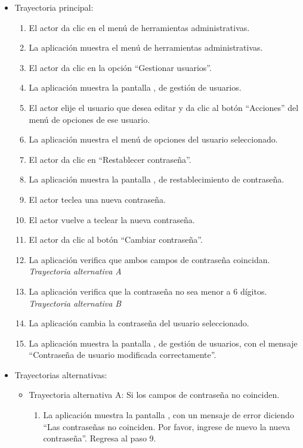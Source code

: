 			\begin{itemize}
				\item Trayectoria principal:
					\begin{enumerate}
						\item El actor da clic en el menú de herramientas administrativas.
						\item La aplicación muestra el menú de herramientas administrativas.
						\item El actor da clic en la opción ``Gestionar usuarios''.
						\item La aplicación muestra la pantalla , de gestión de usuarios.
						\item El actor elije el usuario que desea editar y da clic al botón ``Acciones'' del menú de opciones de ese usuario.
						\item La aplicación muestra el menú de opciones del usuario seleccionado.
						\item El actor da clic en ``Restablecer contraseña''.
						\item La aplicación muestra la pantalla , de restablecimiento de contraseña.
						\item El actor teclea una nueva contraseña.
						\item El actor vuelve a teclear la nueva contraseña.
						\item El actor da clic al botón ``Cambiar contraseña''.
						\item La aplicación verifica que ambos campos de contraseña coincidan. \textsl{Trayectoria alternativa A}
						\item La aplicación verifica que la contraseña no sea menor a 6 dígitos. \textsl{Trayectoria alternativa B}
						\item La aplicación cambia la contraseña del usuario seleccionado.
						\item La aplicación muestra la pantalla , de gestión de usuarios, con el mensaje ``Contraseña de usuario modificada correctamente''.
					\end{enumerate}
				\item Trayectorias alternativas:
					\begin{itemize}
						\item Trayectoria alternativa A: Si los campos de contraseña no coinciden.
							\begin{enumerate}
								\item La aplicación muestra la pantalla , con un mensaje de error diciendo ``Las contraseñas no coinciden. Por favor, ingrese de nuevo la nueva contraseña''. Regresa al paso 9.

\end{enumerate}
\end{itemize}
\end{itemize}
